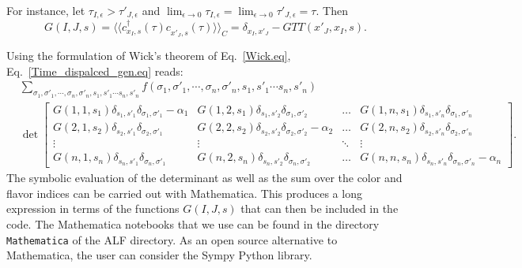 For instance, let  $\tau_{I,\epsilon}   > \tau'_{J,\epsilon}  $  and $ \lim_{\epsilon \rightarrow 0 } \tau_{I,\epsilon}   = \lim_{\epsilon \rightarrow 0 }\tau'_{J,\epsilon} = \tau$. Then 
\begin{equation}
	G(I,J,s)   =  \langle \langle  c^{\dagger}_{x_I,s}(\tau) c^{\phantom\dagger}_{x'_{J},s}(\tau)  \rangle \rangle_{C}  =   \delta_{x_I,x'_J} -  GTT(x'_J,x_I,s).
\end{equation}

Using the formulation of Wick's theorem of Eq.~\eqref{Wick.eq},  Eq.~\eqref{Time_dispalced_gen.eq}  reads: 
\begin{align}
	& \sum_{\sigma_1, \sigma'_1, \cdots, \sigma_n, \sigma'_n,  s_1, s'_1  \cdots s_n,  s'_n  }  f( \sigma_1, \sigma'_1, \cdots, \sigma_n, \sigma'_n,  s_1, s'_1  \cdots s_n,  s'_n ) 
	\\
	& \det  
\begin{bmatrix}
   G(1,1,s_1) \delta_{s_1,s'_1} \delta_{\sigma_1,\sigma'_1} - \alpha_1 & 
   G(1,2,s_1) \delta_{s_1,s'_2} \delta_{\sigma_1,\sigma'_2}   \phantom{ - \alpha_1}         & \dots   &   
   G(1,n,s_1) \delta_{s_1,s'_n} \delta_{\sigma_1,\sigma'_n}   \phantom{ - \alpha_1} \\
   G(2,1,s_2) \delta_{s_2,s'_1} \delta_{\sigma_2,\sigma'_1}  \phantom{ - \alpha_1} &   
   G(2,2,s_2) \delta_{s_2,s'_2} \delta_{\sigma_2,\sigma'_2} - \alpha_2  & \dots  &
    G(2,n,s_2) \delta_{s_2,s'_n} \delta_{\sigma_2,\sigma'_n} \phantom{ - \alpha_2}  \\
    \vdots & \vdots &  \ddots & \vdots \\
    G(n,1,s_n) \delta_{s_n,s'_1} \delta_{\sigma_n,\sigma'_1}   \phantom{- \alpha_n} & 
    G(n,2,s_n) \delta_{s_n,s'_2} \delta_{\sigma_n,\sigma'_2}   \phantom{- \alpha_n} & \dots  & 
     G(n,n,s_n) \delta_{s_n,s'_n} \delta_{\sigma_n,\sigma'_n}   - \alpha_n  
 \end{bmatrix}.   \nonumber 
\end{align}
The  symbolic evaluation of the  determinant   as well as the sum over the color and flavor indices can be carried out with Mathematica.  This  produces a  long expression in terms of the   functions $G(I,J,s)$ that can then be  included in the code.   The Mathematica notebooks  that we use  can be found in the directory  \texttt{Mathematica}  of  the ALF  directory.   As an open source alternative to Mathematica, the user can consider the Sympy Python library. 
